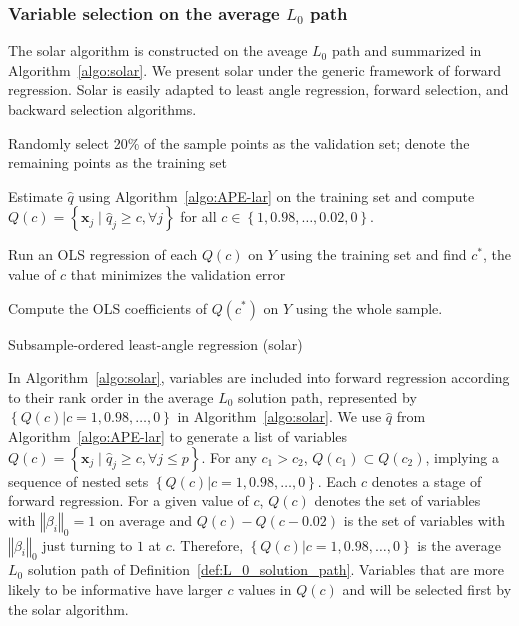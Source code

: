 \documentclass[11pt,review,authoryear]{elsarticle}
\begin{document}
\subsubsection{Variable selection on the average $L_0$ path}

The solar algorithm is constructed on the aveage $L_0$ path and summarized in Algorithm~\ref{algo:solar}. We present solar under the generic framework of forward regression. Solar is easily adapted to least angle regression, forward selection, and backward selection algorithms.


\begin{algorithm}[ht]


  \smallskip
  Randomly select 20\% of the sample points as the validation set; denote the remaining points as the training set\;

  Estimate $\widehat{q}$ using Algorithm~\ref{algo:APE-lar} on the training set and compute $Q(c) = \left\{ \mathbf{x}_j \; \vert \; \widehat{q}_j \geqslant c, \forall j\right\}$ for all $c \in \left\{ 1, 0.98, \ldots, 0.02, 0 \right\}.$

  Run an OLS regression of each $Q(c)$ on $Y$ using the training set and find $c^*$, the value of $c$ that minimizes the validation error\;

  Compute the OLS coefficients of $Q(c^*)$ on $Y$ using the whole sample.

  \caption{Subsample-ordered least-angle regression (solar) \label{algo:solar}}
\end{algorithm}


In Algorithm~\ref{algo:solar}, variables are included into forward regression according to their rank order in the average $L_0$ solution path, represented by $\left\{ Q(c) \vert c = 1, 0.98, \ldots, 0\right\}$ in Algorithm~\ref{algo:solar}. We use $\widehat{q}$ from Algorithm~\ref{algo:APE-lar} to generate a list of variables $Q \left( c \right) = \left\{ \mathbf{x}_j \; \vert \; \widehat{q}_j \geqslant c, \forall j \leqslant p \right\}$. For any $c_1 > c_2$, $Q\left(c_1\right) \subset Q\left(c_2\right)$, implying a sequence of nested sets $\left\{ Q(c) \vert c = 1, 0.98, \ldots, 0\right\}$. Each $c$ denotes a stage of forward regression. For a given value of $c$, $Q(c)$ denotes the set of variables with $\left\Vert \beta_i \right\Vert_0=1$ on average and $Q(c) - Q(c - 0.02)$ is the set of variables with $\left\Vert \beta_i \right\Vert_0$ just turning to $1$ at $c$. Therefore, $\left\{ Q(c) \vert c = 1, 0.98, \ldots, 0\right\}$ is the average $L_0$ solution path of Definition~\ref{def:L_0_solution_path}. Variables that are more likely to be informative have larger $c$ values in $Q(c)$ and will be selected first by the solar algorithm.
\end{document}
